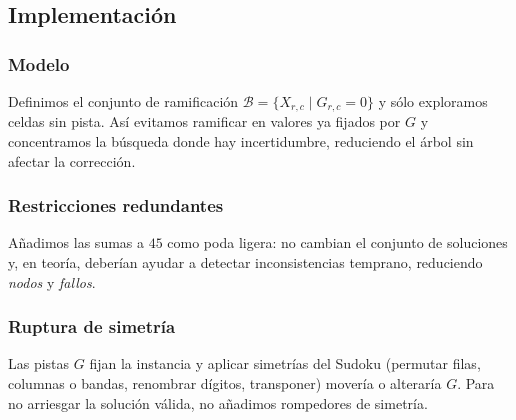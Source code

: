
\subsection{Implementación}\label{sec:01-sudoku-implementacion}

\subsubsection*{Modelo}
Definimos el conjunto de ramificación \(\mathcal{B}=\{X_{r,c}\mid G_{r,c}=0\}\) y sólo exploramos celdas sin pista. Así evitamos ramificar en valores ya fijados por \(G\) y concentramos la búsqueda donde hay incertidumbre, reduciendo el árbol sin afectar la corrección.

\subsubsection*{Restricciones redundantes}
Añadimos las sumas a \(45\) como poda ligera: no cambian el conjunto de soluciones y, en teoría, deberían ayudar a detectar inconsistencias temprano, reduciendo \emph{nodos} y \emph{fallos}.

\subsubsection*{Ruptura de simetría}
Las pistas \(G\) fijan la instancia y aplicar simetrías del Sudoku (permutar filas, columnas o bandas, renombrar dígitos, transponer) movería o alteraría \(G\). Para no arriesgar la solución válida, no añadimos rompedores de simetría.
